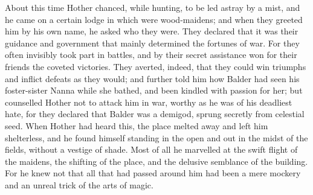 \documentclass[10pt,a4paper]{report}
\begin{document}
About this time Hother chanced, while hunting, to be led astray by a mist, and he came on a certain lodge in which were wood-maidens; and when they greeted him by his own name, he asked who they were. They declared that it was their guidance and government that mainly determined the fortunes of war. For they often invisibly took part in battles, and by their secret assistance won for their friends the coveted victories. They averted, indeed, that they could win triumphs and inflict defeats as they would; and further told him how Balder had seen his foster-sister Nanna while she bathed, and been kindled with passion for her; but counselled Hother not to attack him in war, worthy as he was of his deadliest hate, for they declared that Balder was a demigod, sprung secretly from celestial seed. When Hother had heard this, the place melted away and left him shelterless, and he found himself standing in the open and out in the midst of the fields, without a vestige of shade. Most of all he marvelled at the swift flight of the maidens, the shifting of the place, and the delusive semblance of the building. For he knew not that all that had passed around him had been a mere mockery and an unreal trick of the arts of magic.\\
\end{document}
